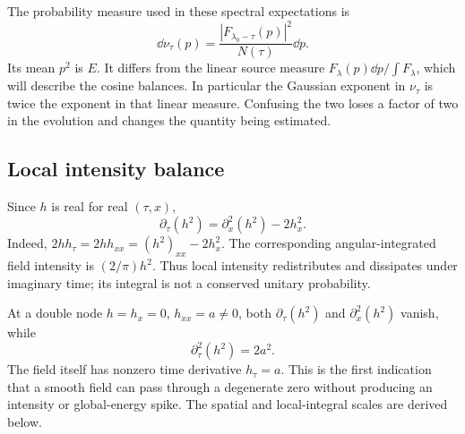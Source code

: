 The probability measure used in these spectral expectations is
\begin{equation}\label{eq:spectral-measure}
 \dd\nu_\tau(p)=\frac{|F_{\lambda_0-\tau}(p)|^2}{N(\tau)}\dd p.
\end{equation}
Its mean \(p^2\) is \(E\). It differs from the linear source measure
\(F_\lambda(p)\dd p/\int F_\lambda\), which will describe the cosine
balances. In particular the Gaussian exponent in \(\nu_\tau\) is twice
the exponent in that linear measure. Confusing the two loses a factor
of two in the evolution and changes the quantity being estimated.

\subsection{Local intensity balance}
Since \(h\) is real for real \((\tau,x)\),
\begin{equation}\label{eq:local-density}
 \partial_\tau(h^2)=\partial_x^2(h^2)-2h_x^2.
\end{equation}
Indeed, \(2hh_\tau=2hh_{xx}=(h^2)_{xx}-2h_x^2\).
The corresponding angular-integrated field intensity is
\((2/\pi)h^2\). Thus local intensity redistributes and dissipates under
imaginary time; its integral is not a conserved unitary probability.

At a double node \(h=h_x=0\), \(h_{xx}=a\ne0\), both
\(\partial_\tau(h^2)\) and \(\partial_x^2(h^2)\) vanish, while
\begin{equation}\label{eq:density-event}
 \partial_\tau^2(h^2)=2a^2.
\end{equation}
The field itself has nonzero time derivative \(h_\tau=a\).
This is the first indication that a smooth field can pass through a
degenerate zero without producing an intensity or global-energy spike.
The spatial and local-integral scales are derived below.
